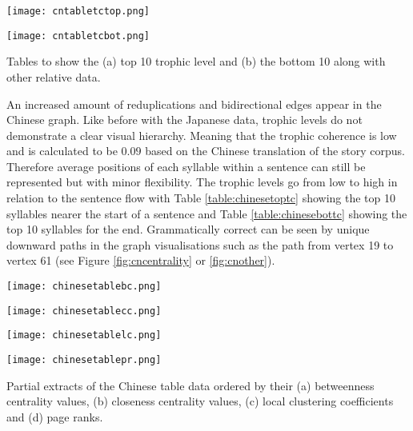 \begin{table}[H]
\centering
\begin{subtable}{.45\textwidth}
	\centering
	\texttt{[image: cntabletctop.png]}
	\caption{}
	\label{table:chinesetoptc}
\end{subtable}
\hfill
\begin{subtable}{.45\textwidth}
	\centering
	\texttt{[image: cntabletcbot.png]}
	\caption{}
	\label{table:chinesebottc}
\end{subtable}
\caption{Tables to show the (a) top 10 trophic level and (b) the bottom 10 along with other relative data.}
\end{table}

An increased amount of reduplications and bidirectional edges appear in the Chinese graph. Like before with the Japanese data, trophic levels do not demonstrate a clear visual hierarchy. Meaning that the trophic coherence is low and is calculated to be $0.09$ based on the Chinese translation of the story corpus. Therefore average positions of each syllable within a sentence can still be represented but with minor flexibility. The trophic levels go from low to high in relation to the sentence flow with Table \ref{table:chinesetoptc} showing the top 10 syllables nearer the start of a sentence and Table \ref{table:chinesebottc} showing the top 10 syllables for the end. Grammatically correct can be seen by unique downward paths in the graph visualisations such as the path from vertex 19 to vertex 61 (see Figure \ref{fig:cncentrality} or \ref{fig:cnother}).

\begin{table}[H]
\centering
\begin{subtable}{.2\textwidth}
	\centering
	\texttt{[image: chinesetablebc.png]}
	\caption{}
	\label{table:chinesetablebc}
\end{subtable}
\hfill
\begin{subtable}{.2\textwidth}
	\centering
	\texttt{[image: chinesetablecc.png]}
	\caption{}
	\label{table:chinesetablecc}
\end{subtable}
\hfill
\begin{subtable}{.2\textwidth}
	\centering
	\texttt{[image: chinesetablelc.png]}
	\caption{}
	\label{table:chinesetablelc}
\end{subtable}
\hfill
\begin{subtable}{.2\textwidth}
	\centering
	\texttt{[image: chinesetablepr.png]}
	\caption{}
	\label{table:chinesetablepr}
\end{subtable}
\caption{Partial extracts of the Chinese table data ordered by their (a) betweenness centrality values, (b) closeness centrality values, (c) local clustering coefficients and (d) page ranks.}
\end{table}

